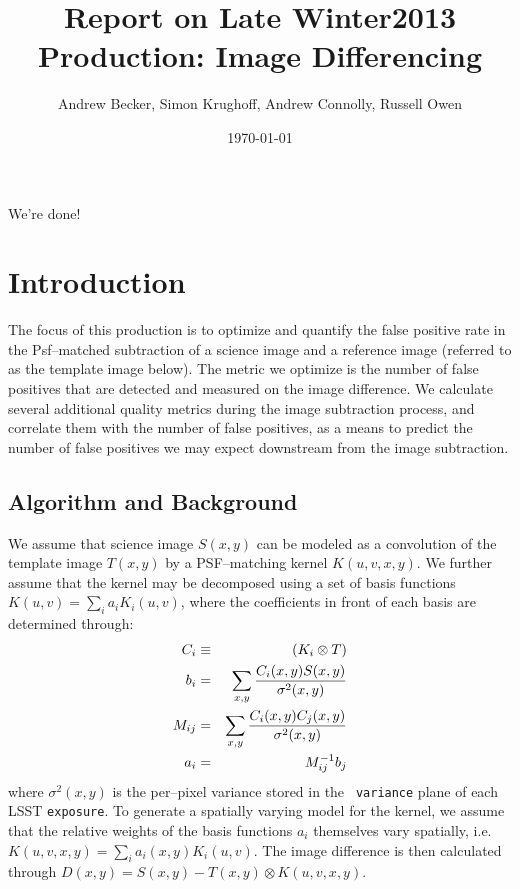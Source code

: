 \documentclass[prd, nofootinbib, floatfix, 11pt,tightenlines,times]{article}
\author{Andrew Becker, Simon Krughoff, Andrew Connolly, Russell Owen}
\title{Report on Late Winter2013 Production: Image Differencing}
\date{\today}
\begin{document}
\maketitle

We're done!

\clearpage
\tableofcontents
\clearpage

\section{Introduction}

The focus of this production is to optimize and quantify the false
positive rate in the Psf--matched subtraction of a science image and a
reference image (referred to as the template image below).  The metric
we optimize is the number of false positives that are detected and
measured on the image difference.  We calculate several additional
quality metrics during the image subtraction process, and correlate
them with the number of false positives, as a means to predict the
number of false positives we may expect downstream from the image
subtraction.

\subsection{Algorithm and Background}

We assume that science image $S(x,y)$ can be modeled as a convolution
of the template image $T(x,y)$ by a PSF--matching kernel $K(u,v,x,y)$.
We further assume that the kernel may be decomposed using a set of
basis functions $K(u,v) = \sum_i a_i K_i(u,v)$, where the coefficients
in front of each basis are determined through:
%
\begin{eqnarray}
C_i & \equiv & (K_i \otimes T) \\ \nonumber
b_{i}  & = & \sum_{x,y} {{C_i(x,y) S(x,y)}\over{\sigma^2(x,y)}}   \nonumber \\ 
M_{ij} & = & \sum_{x,y} {{C_i(x,y) C_j(x,y)}\over{\sigma^2(x,y)}}  \nonumber \\ 
a_{i}  & = & M^{-1}_{ij} b_{j} \nonumber 
\label{eq-soln}
\end{eqnarray}
where $\sigma^2(x,y)$ is the per--pixel variance stored in the {\tt
  variance} plane of each LSST {\tt exposure}.  To generate a
spatially varying model for the kernel, we assume that the relative
weights of the basis functions $a_i$ themselves vary spatially,
i.e. $K(u,v,x,y) = \sum_i a_i(x,y) K_i(u,v)$.  The image difference is
then calculated through $D(x,y) = S(x,y) - T(x,y) \otimes K(u,v,x,y)$.
\end{document}
